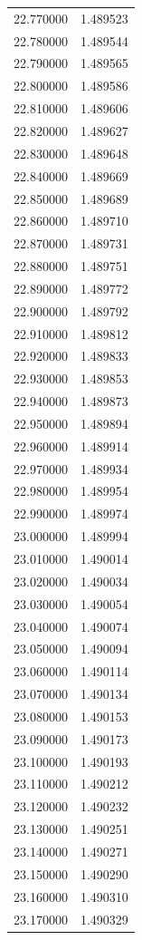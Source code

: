 \begin{tabular}{rr}
22.770000 & 1.489523 \\
22.780000 & 1.489544 \\
22.790000 & 1.489565 \\
22.800000 & 1.489586 \\
22.810000 & 1.489606 \\
22.820000 & 1.489627 \\
22.830000 & 1.489648 \\
22.840000 & 1.489669 \\
22.850000 & 1.489689 \\
22.860000 & 1.489710 \\
22.870000 & 1.489731 \\
22.880000 & 1.489751 \\
22.890000 & 1.489772 \\
22.900000 & 1.489792 \\
22.910000 & 1.489812 \\
22.920000 & 1.489833 \\
22.930000 & 1.489853 \\
22.940000 & 1.489873 \\
22.950000 & 1.489894 \\
22.960000 & 1.489914 \\
22.970000 & 1.489934 \\
22.980000 & 1.489954 \\
22.990000 & 1.489974 \\
23.000000 & 1.489994 \\
23.010000 & 1.490014 \\
23.020000 & 1.490034 \\
23.030000 & 1.490054 \\
23.040000 & 1.490074 \\
23.050000 & 1.490094 \\
23.060000 & 1.490114 \\
23.070000 & 1.490134 \\
23.080000 & 1.490153 \\
23.090000 & 1.490173 \\
23.100000 & 1.490193 \\
23.110000 & 1.490212 \\
23.120000 & 1.490232 \\
23.130000 & 1.490251 \\
23.140000 & 1.490271 \\
23.150000 & 1.490290 \\
23.160000 & 1.490310 \\
23.170000 & 1.490329 \\

\end{tabular}
